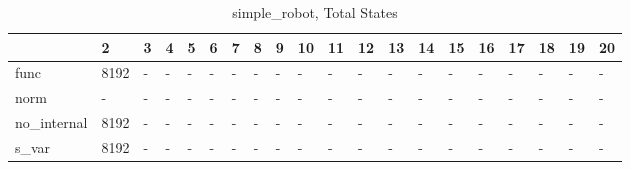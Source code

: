 \begin{table}
\caption{simple_robot, Total States}
\label{simple_robot_total}
\begin{tabular}{llllllllllllllllllll}
\toprule
 & 2 & 3 & 4 & 5 & 6 & 7 & 8 & 9 & 10 & 11 & 12 & 13 & 14 & 15 & 16 & 17 & 18 & 19 & 20 \\
\midrule
func & 8192 & - & - & - & - & - & - & - & - & - & - & - & - & - & - & - & - & - & - \\
norm & - & - & - & - & - & - & - & - & - & - & - & - & - & - & - & - & - & - & - \\
no_internal & 8192 & - & - & - & - & - & - & - & - & - & - & - & - & - & - & - & - & - & - \\
s_var & 8192 & - & - & - & - & - & - & - & - & - & - & - & - & - & - & - & - & - & - \\
\bottomrule
\end{tabular}
\end{table}
